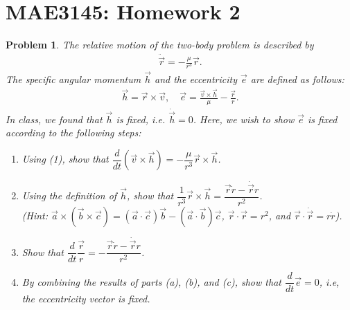\documentclass[10pt]{article}
\date{}
\newcommand{\norm}[1]{\ensuremath{\left\| #1 \right\|}}
\newcommand{\deriv}[2]{\ensuremath{\frac{\partial #1}{\partial #2}}}
\theoremstyle{plain}\theorembodyfont{\normalfont}
\newtheorem{prob}{Problem}[section]
\newenvironment{subprob}%
{\renewcommand{\theenumi}{\alph{enumi}}\renewcommand{\labelenumi}{(\theenumi)}\begin{enumerate}}%
{\end{enumerate}}%
\begin{document}
\setcounter{page}{1}
\pagestyle{plain}
\section*{MAE3145: Homework 2}
\vspace*{-0.4cm}


\begin{prob}
The relative motion of the two-body problem is described by
\begin{align}
\ddot{\vec r} = -\frac{\mu}{r^3}\vec r.
\end{align}
The specific angular momentum $\vec h$ and the eccentricity $\vec e$ are defined as follows:
\begin{align*}
\vec h = \vec r \times \vec v,\quad \vec e = \frac{\vec v\times\vec h}{\mu}- \frac{\vec r}{r}.
\end{align*}
In class, we found that $\vec h$ is fixed, i.e. $\dot{\vec h}=0$. Here, we wish to show $\vec e$ is fixed according to the following steps:
\begin{subprob}
\item Using (1), show that $\dfrac{d}{dt}(\vec v\times\vec h) = -\dfrac{\mu}{r^3} \vec r\times \vec h$.
\item Using the definition of $\vec h$, show that $\dfrac{1}{r^3}\vec r \times \vec h = \dfrac{\vec r \dot r - \dot{\vec r} r}{r^2}$.\\
(Hint: $\vec a\times (\vec b \times \vec c) = (\vec a \cdot \vec c)\vec b - (\vec a \cdot \vec b)\vec c$,\; $\vec r \cdot \vec r = r^2$, and $\vec r \cdot \dot{\vec r} = r\dot r$).
\item Show that $\dfrac{d}{dt}\dfrac{\vec r}{r} = -\dfrac{\vec r \dot r - \dot{\vec r} r}{r^2}$.
\item By combining the results of parts (a), (b), and (c), show that $\dfrac{d}{dt}\vec e=0$, i.e, the eccentricity vector is fixed.
\end{subprob}
\end{prob}
\end{document}
